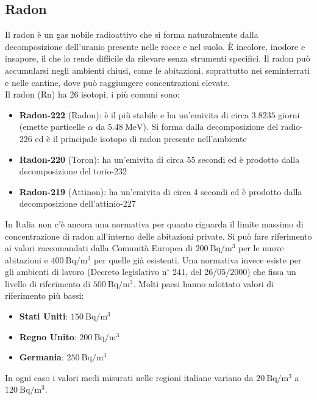 \subsection{Radon}
Il radon è un gas nobile radioattivo che si forma naturalmente dalla decomposizione dell'uranio presente nelle rocce e nel suolo. È incolore, inodore e insapore, il che lo rende difficile da rilevare senza strumenti specifici. Il radon può accumularsi negli ambienti chiusi, come le abitazioni, soprattutto nei seminterrati e nelle cantine, dove può raggiungere concentrazioni elevate.\\
Il radon (Rn) ha 26 isotopi, i più comuni sono:
\begin{itemize}
    \item \textbf{Radon-222} (Radon): è il più stabile e ha un'emivita di circa $3.8235$ giorni (emette particelle $\alpha$ da $\qty{5.48}{\mega\electronvolt}$). Si forma dalla decomposizione del radio-226 ed è il principale isotopo di radon presente nell'ambiente
    \item \textbf{Radon-220} (Toron): ha un'emivita di circa 55 secondi ed è prodotto dalla decomposizione del torio-232
    \item \textbf{Radon-219} (Attinon): ha un'emivita di circa 4 secondi ed è prodotto dalla decomposizione dell'attinio-227
\end{itemize}
In Italia non c'è ancora una normativa per quanto riguarda il limite massimo di concentrazione di radon all'interno delle abitazioni private. Si può fare riferimento ai valori raccomandati dalla Comunità Europea di $\qty{200}{\becquerel\per\meter\cubed}$ per le nuove abitazioni e $\qty{400}{\becquerel\per\meter\cubed}$ per quelle già esistenti. Una normativa invece esiste per gli ambienti di lavoro (Decreto legislativo n$^\circ$ 241, del 26/05/2000) che fissa un livello di riferimento di $\qty{500}{\becquerel\per\meter\cubed}$.
Molti paesi hanno adottato valori di riferimento più bassi:
\begin{itemize}
    \item \textbf{Stati Uniti}: $\qty{150}{\becquerel\per\meter\cubed}$
    \item \textbf{Regno Unito}: $\qty{200}{\becquerel\per\meter\cubed}$
    \item \textbf{Germania}: $\qty{250}{\becquerel\per\meter\cubed}$
\end{itemize}
In ogni caso i valori medi misurati nelle regioni italiane variano da $\qty{20}{\becquerel\per\meter\cubed}$ a $\qty{120}{\becquerel\per\meter\cubed}$.
